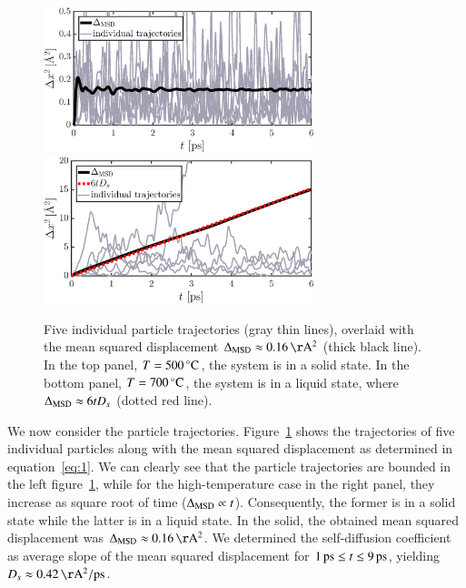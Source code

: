 \begin{figure}[!ht]
\begin{center}
  \includegraphics[width=0.7\textwidth]{../figures/MSD-500}  \\
    \includegraphics[width=0.7\textwidth]{../figures/MSD-700} 
  \caption{Five individual particle trajectories (gray thin lines), overlaid with the mean squared displacement $\Delta_{\rm MSD} \approx \unit[0.16]{\AA^2}$ (thick black line). In the top panel, $T=\unit[500]{^\circ C}$, the system is in a solid state. In the bottom panel, $T=\unit[700]{^\circ C}$, the system is in a liquid state, where $\Delta_{\rm MSD} \approx 6 t D_s$ (dotted red line).}
  \label{fig:MSD}
\end{center}
\end{figure}
We now consider the particle trajectories. Figure~\ref{fig:MSD} shows the trajectories of five individual particles along with the mean squared displacement as determined in equation~\eqref{eq:1}. We can clearly see that the particle trajectories are bounded in the left figure~\ref{fig:MSD}, while for the high-temperature case in the right panel, they increase as square root of time ($\Delta_{\rm MSD} \propto t$). Consequently, the former is in a solid state while the latter is in a liquid state.  
In the solid, the obtained mean squared displacement was $\Delta_{\rm MSD} \approx \unit[0.16]{\AA^2}$.
We determined the self-diffusion coefficient as average slope of the mean squared displacement for $\unit[1]{ps} \leq t \leq \unit[9]{ps}$, yielding $D_s \approx \unit[0.42]{\AA^2/ps}$. 


